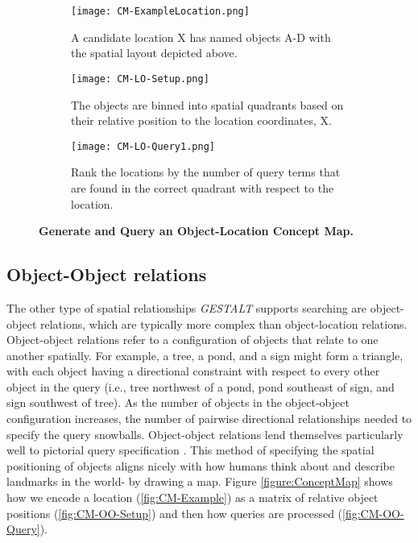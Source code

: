 \begin{figure*}[h]
    \centering
    \begin{subfigure}[t]{.25\textwidth}
        \texttt{[image: CM-ExampleLocation.png]}
        \caption{\small A candidate location X has named objects A-D with the spatial layout depicted above.} 
        \label{fig:CM-LO-Example}
    \end{subfigure}
    \hfill
    \begin{subfigure}[t]{.25\textwidth}
        \texttt{[image: CM-LO-Setup.png]}
        \caption{\small The objects are binned into spatial quadrants based on their relative position to the location coordinates, X.} 
        \label{fig:CM-LO-Setup}
    \end{subfigure}
    \hfill
        \begin{subfigure}[t]{.25\textwidth}
        \texttt{[image: CM-LO-Query1.png]}
        \caption{\small Rank the locations by the number of query terms that are found in the correct quadrant with respect to the location.}
        \label{fig:CM-LO-Query}
    \hfill
    \end{subfigure}
    \caption{\textbf{Generate and Query an Object-Location Concept Map.}}\label{figure:ConceptMap-LO} 
\end{figure*}



\subsection{Object-Object relations}

The other type of spatial relationships \emph{GESTALT} supports searching are object-object relations, which are typically more complex than object-location relations.
Object-object relations refer to a configuration of objects that relate to one another spatially.
For example, a tree, a pond, and a sign might form a triangle, with each object having a directional constraint with respect to every other object in the query (i.e., tree northwest of a pond, pond southeast of sign, and sign southwest of tree).
As the number of objects in the object-object configuration increases, the number of pairwise directional relationships needed to specify the query snowballs.
Object-object relations lend themselves particularly well to pictorial query specification .
This method of specifying the spatial positioning of objects aligns nicely with how humans think about and describe landmarks in the world- by drawing a map. 
Figure \ref{figure:ConceptMap} shows how we encode a location (\ref{fig:CM-Example}) as a matrix of relative object positions (\ref{fig:CM-OO-Setup}) and then how queries are processed (\ref{fig:CM-OO-Query}).

